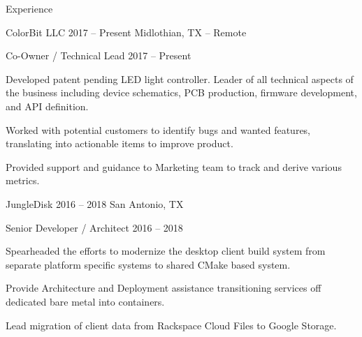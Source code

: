 \documentclass{resume}
\begin{document}
\begin{rSection}{Experience}
        \begin{rSubsection}{ColorBit LLC}
            {2017 -- Present} %
            {Midlothian, TX -- Remote} %
            \begin{rSubsubsection}{Co-Owner / Technical Lead}
                {2017 -- Present} %
                {\small
            \item Developed patent pending LED light controller. Leader of all technical
                aspects of the business including device schematics, PCB production,
                firmware development, and API definition.
            \item Worked with potential customers to identify bugs and wanted features,
                translating into actionable items to improve product.
            \item Provided support and guidance to Marketing team to track and derive
                various metrics.
                }
            \end{rSubsubsection}
        \end{rSubsection}

        \begin{rSubsection}{JungleDisk}
            {2016 -- 2018} %
            {San Antonio, TX}
            \begin{rSubsubsection}{Senior Developer / Architect}
                {2016 -- 2018} %
                {\small
            \item Spearheaded the efforts to modernize the desktop client build system
                from separate platform specific systems to shared CMake based system.
            \item Provide Architecture and Deployment assistance transitioning services
                off dedicated bare metal into containers.
            \item Lead migration of client data from Rackspace Cloud Files to Google
                Storage.
                }
            \end{rSubsubsection}
        \end{rSubsection}


\end{rSection}
\end{document}
